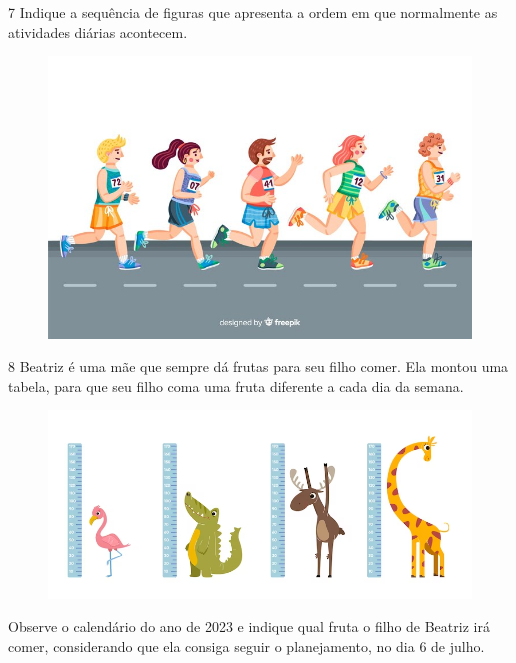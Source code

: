 \num{7} Indique a sequência de figuras que apresenta a ordem em que normalmente as
atividades diárias acontecem.

\begin{figure}[htpb!]
\includegraphics[width=\textwidth]{./media/image142.png}
\end{figure}


\num{8} Beatriz é uma mãe que sempre dá frutas para seu filho comer. Ela
montou uma tabela, para que seu filho coma uma fruta diferente a cada
dia da semana.

\begin{figure}[htpb!]
\includegraphics[width=\textwidth]{./media/image143.png}
\end{figure}

Observe o calendário do ano de 2023 e indique qual fruta o filho de
Beatriz irá comer, considerando que ela consiga seguir o planejamento, no dia 6 de julho.

